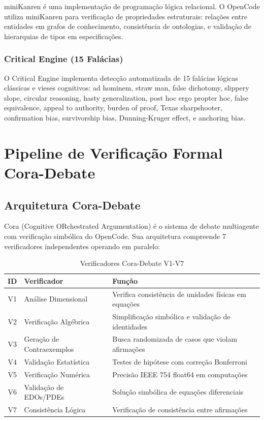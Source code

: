 \documentclass[12pt,a4paper,sumario=tradicional]{abntex2}
\begin{document}
miniKanren é uma implementação de programação lógica relacional. O OpenCode utiliza miniKanren para verificação de propriedades estruturais: relações entre entidades em grafos de conhecimento, consistência de ontologias, e validação de hierarquias de tipos em especificações.

\subsection{Critical Engine (15 Falácias)}

O Critical Engine implementa detecção automatizada de 15 falácias lógicas clássicas e vieses cognitivos: ad hominem, straw man, false dichotomy, slippery slope, circular reasoning, hasty generalization, post hoc ergo propter hoc, false equivalence, appeal to authority, burden of proof, Texas sharpshooter, confirmation bias, survivorship bias, Dunning-Kruger effect, e anchoring bias.

\chapter{Pipeline de Verificação Formal Cora-Debate}

\section{Arquitetura Cora-Debate}

Cora (Cognitive ORchestrated Argumentation) é o sistema de debate multiagente com verificação simbólica do OpenCode. Sua arquitetura compreende 7 verificadores independentes operando em paralelo:

\begin{table}[H]
\centering
\caption{Verificadores Cora-Debate V1-V7}
\label{tab:cora}
\begin{tabular}{@{}clp{5cm}@{}}
\toprule
\textbf{ID} & \textbf{Verificador} & \textbf{Função} \\
\midrule
V1 & Análise Dimensional     & Verifica consistência de unidades físicas em equações \\
V2 & Verificação Algébrica   & Simplificação simbólica e validação de identidades \\
V3 & Geração de Contraexemplos & Busca randomizada de casos que violam afirmações \\
V4 & Validação Estatística   & Testes de hipótese com correção Bonferroni \\
V5 & Verificação Numérica    & Precisão IEEE 754 float64 em computações \\
V6 & Validação de EDOs/PDEs  & Solução simbólica de equações diferenciais \\
V7 & Consistência Lógica     & Verificação de consistência entre afirmações \\
\bottomrule
\end{tabular}
\end{table}
\end{document}
